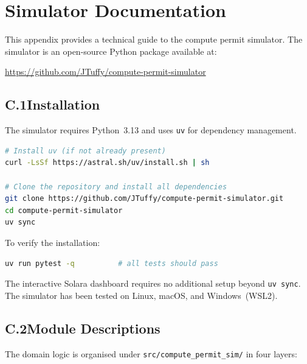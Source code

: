 
\section{Simulator Documentation}

This appendix provides a technical guide to the compute permit simulator.
The simulator is an open-source Python package available at:
\begin{center}
\url{https://github.com/JTuffy/compute-permit-simulator}
\end{center}

\subsection*{C.1\quad Installation}

The simulator requires Python~3.13 and uses \texttt{uv} for dependency management.

\begin{lstlisting}[language=bash, caption={Installing the simulator}]
# Install uv (if not already present)
curl -LsSf https://astral.sh/uv/install.sh | sh

# Clone the repository and install all dependencies
git clone https://github.com/JTuffy/compute-permit-simulator.git
cd compute-permit-simulator
uv sync
\end{lstlisting}

To verify the installation:
\begin{lstlisting}[language=bash]
uv run pytest -q          # all tests should pass
\end{lstlisting}

The interactive Solara dashboard requires no additional setup beyond \texttt{uv sync}. The simulator has been tested on Linux, macOS, and Windows~(WSL2).

\subsection*{C.2\quad Module Descriptions}

The domain logic is organised under \texttt{src/compute\_permit\_sim/} in four layers:

